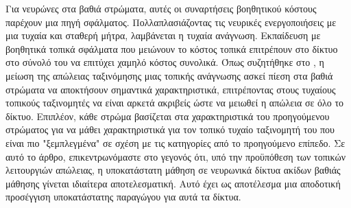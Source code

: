 \documentclass[12pt]{report}
\begin{document}
Για νευρώνες στα βαθιά στρώματα, αυτές οι συναρτήσεις βοηθητικού κόστους παρέχουν μια πηγή σφάλματος. Πολλαπλασιάζοντας τις νευρικές ενεργοποιήσεις με μια τυχαία και σταθερή μήτρα, λαμβάνεται η τυχαία ανάγνωση. Εκπαίδευση με βοηθητικά τοπικά σφάλματα που μειώνουν το κόστος τοπικά επιτρέπουν στο δίκτυο στο σύνολό του να επιτύχει χαμηλό κόστος συνολικά. Όπως συζητήθηκε στο \cite{mostafa2017}, η μείωση της απώλειας ταξινόμησης μιας τοπικής ανάγνωσης ασκεί πίεση στα βαθιά στρώματα να αποκτήσουν σημαντικά χαρακτηριστικά, επιτρέποντας στους τυχαίους τοπικούς ταξινομητές να είναι αρκετά ακριβείς ώστε να μειωθεί η απώλεια σε όλο το δίκτυο. Επιπλέον, κάθε στρώμα βασίζεται στα χαρακτηριστικά του προηγούμενου στρώματος για να μάθει χαρακτηριστικά για τον τοπικό τυχαίο ταξινομητή του που είναι πιο "ξεμπλεγμένα" σε σχέση με τις κατηγορίες από το προηγούμενο επίπεδο. Σε αυτό το άρθρο, επικεντρωνόμαστε στο γεγονός ότι, υπό την προϋπόθεση των τοπικών λειτουργιών απώλειας, η υποκατάστατη μάθηση σε νευρωνικά δίκτυα ακίδων βαθιάς μάθησης γίνεται ιδιαίτερα αποτελεσματική. Αυτό έχει ως αποτέλεσμα μια αποδοτική προσέγγιση υποκατάστατης παραγώγου για αυτά τα δίκτυα.
\end{document}
